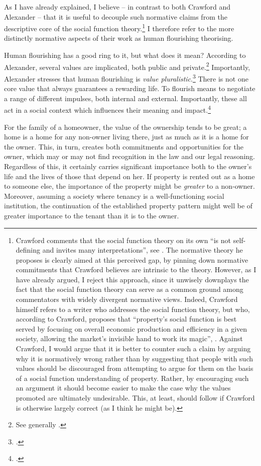 As I have already explained, I believe -- in contrast to both Crawford and Alexander -- that it is useful to decouple such normative claims from the descriptive core of the social function theory.\footnote{Crawford comments that the social function theory on its own  ``is not self-defining and invites many interpretations'', see \cite[1089]{crawford11}. The normative theory he proposes is clearly aimed at  this perceived gap, by pinning down normative commitments that Crawford believes are intrinsic to the theory. However, as I have already argued, I reject this approach, since it unwisely downplays the fact that the social function theory can serve as a common ground among commentators with widely divergent normative views. Indeed, Crawford himself refers  to a writer who addresses the social function theory, but who, according to Crawford, proposes that ``property's social function is best served by focusing on overall economic production and efficiency in a given society, allowing the market's invisible hand to work its magic'', \cite[see][1089]{crawford11}. Against Crawford, I would argue that it is better to counter such a claim by arguing why it is normatively wrong rather than by suggesting that people with such values should be discouraged from attempting to argue for them on the basis of a social function understanding of property. Rather, by encouraging such an argument it should become easier to make the case why the values promoted are ultimately undesirable. This, at least, should follow if Crawford is otherwise largely correct (as I think he might be).} I therefore refer to the more distinctly normative aspects of their work as human flourishing theorising.

Human flourishing has a good ring to it, but what does it mean? According to Alexander, several values are implicated, both public and private.\footnote{See generally \cite{alexander14,alexander11}.} Importantly, Alexander stresses that human flourishing is {\it value pluralistic}.\footnote{\cite[750-751]{alexander09}.} There is not one core value that always guarantees a rewarding life. To flourish means to negotiate a range of different impulses, both internal and external. Importantly, these all act in a social context which influences their meaning and impact.\footcite[1035-1052]{alexander11}

For the family of a homeowner, the value of the ownership tends to be great; a home is a home for any non-owner living there, just as much as it is a home for the owner. This, in turn, creates both commitments and opportunities for the owner, which may or may not find recognition in the law and our legal reasoning. Regardless of this, it certainly carries significant importance both to the owner's life and the lives of those that depend on her. If property is rented out as a home to someone else, the importance of the property might be {\it greater} to a non-owner. Moreover, assuming a society where tenancy is a well-functioning social institution, the continuation of the established property pattern might well be of greater importance to the tenant than it is to the owner.


